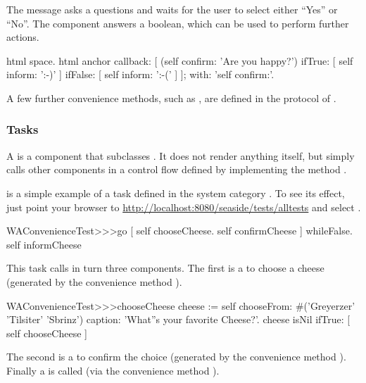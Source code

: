 \documentclass[a4paper,10pt,twoside]{book}
\begin{document}
The message  asks a questions and waits for the user to select either ``Yes'' or ``No''.
The component answers a boolean, which can be used to perform further actions.

\begin{code}{}
html space.
html anchor
	callback: [
		(self confirm: 'Are you happy?')
			ifTrue: [ self inform: ':-)' ]
			ifFalse: [ self inform: ':-(' ]
		];
	with: 'self confirm:'.
\end{code}

A few further convenience methods, such as , are defined in the  protocol of .

\subsubsection{Tasks}

A  is a component that subclasses .
It does not render anything itself, but simply calls other components in a control flow defined by implementing the method .

 is a simple example of a task defined in the system category .
To see its effect, just point your browser to \url{http://localhost:8080/seaside/tests/alltests} and select .

\begin{code}{}
WAConvenienceTest>>>go
	[ self chooseCheese.
	  self confirmCheese ] whileFalse.
	self informCheese
\end{code}

This task calls in turn three components.
The first is a  to choose a cheese (generated by the convenience method ).

\begin{code}{}
WAConvenienceTest>>>chooseCheese
	cheese := self
		chooseFrom: #('Greyerzer' 'Tilsiter' 'Sbrinz')
		caption: 'What''s your favorite Cheese?'.
	cheese isNil ifTrue: [ self chooseCheese ]
\end{code}

The second is a  to confirm the choice (generated by the convenience method ).
Finally a  is called (via the convenience method ).
\end{document}
